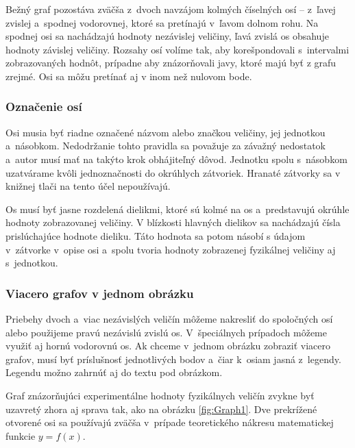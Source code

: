 \documentclass[../../../thesis.tex]{subfiles}
\begin{document}
Bežný graf pozostáva zväčša z~dvoch navzájom kolmých číselných
osí – z~ľavej zvislej a~spodnej vodorovnej,
ktoré sa pretínajú v~ľavom dolnom rohu.
Na spodnej osi sa nachádzajú hodnoty nezávislej veličiny,
ľavá zvislá os obsahuje hodnoty závislej veličiny.
Rozsahy osí volíme tak,
aby korešpondovali s~intervalmi zobrazovaných hodnôt,
prípadne aby znázorňovali javy,
ktoré majú byť z grafu zrejmé.
Osi sa môžu pretínať aj v inom než nulovom bode.

\subsubsection{Označenie osí}
Osi musia byť riadne označené názvom alebo značkou veličiny,
jej jednotkou a~násobkom.
Nedodržanie tohto pravidla sa považuje za závažný nedostatok
a~autor musí mať na takýto krok obhájiteľný dôvod.
Jednotku spolu s~násobkom uzatvárame kvôli jednoznačnosti
do okrúhlych zátvoriek.
Hranaté zátvorky sa v knižnej tlači na tento účel nepoužívajú.

Os musí byť jasne rozdelená dielikmi,
ktoré sú kolmé na os a~predstavujú okrúhle hodnoty
zobrazovanej veličiny.
V blízkosti hlavných dielikov sa nachádzajú čísla prislúchajúce
hodnote dieliku.
Táto hodnota sa potom násobí s údajom v~zátvorke
v~opise osi a~spolu tvoria hodnoty zobrazenej fyzikálnej
veličiny aj s~jednotkou.

\subsubsection{Viacero grafov v jednom obrázku}
Priebehy dvoch a~viac nezávislých veličín môžeme nakresliť
do spoločných osí alebo použijeme pravú nezávislú zvislú os.
V~špeciálnych prípadoch môžeme využiť aj hornú vodorovnú os.
Ak chceme v~jednom obrázku zobraziť viacero grafov,
musí byť príslušnosť jednotlivých bodov a~čiar k~osiam jasná
z~legendy.
Legendu možno zahrnúť aj do textu pod obrázkom.

Graf znázorňujúci experimentálne hodnoty fyzikálnych veličín
zvykne byť uzavretý zhora aj sprava tak,
ako na obrázku \ref{fig:Graph1}.
Dve prekrížené otvorené osi sa používajú zväčša
v~prípade teoretického nákresu matematickej funkcie $y = f(x)$.
\end{document}
